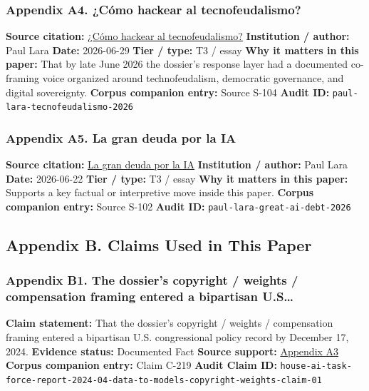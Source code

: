 \documentclass[
  american,
  11pt,
  letterpaper,
]{article}
\begin{document}
\subsubsection{Appendix A4. ¿Cómo hackear al
tecnofeudalismo?}\label{ch-00-appendix-a4-c-mo-hackear-al-tecnofeudalismo}

\textbf{Source citation:}
\href{https://www.dineroenimagen.com/paul-lara/como-hackear-al-tecnofeudalismo/186955}{¿Cómo
hackear al tecnofeudalismo?} \textbf{Institution / author:} Paul Lara
\textbf{Date:} 2026-06-29 \textbf{Tier / type:} T3 / essay \textbf{Why
it matters in this paper:} That by late June 2026 the dossier's response
layer had a documented co-framing voice organized around
technofeudalism, democratic governance, and digital sovereignty.
\textbf{Corpus companion entry:} Source S-104 \textbf{Audit ID:}
\texttt{paul-lara-tecnofeudalismo-2026}

\subsubsection{Appendix A5. La gran deuda por la
IA}\label{ch-00-appendix-a5-la-gran-deuda-por-la-ia}

\textbf{Source citation:}
\href{https://www.dineroenimagen.com/paul-lara/la-gran-deuda-por-la-ia/186930}{La
gran deuda por la IA} \textbf{Institution / author:} Paul Lara
\textbf{Date:} 2026-06-22 \textbf{Tier / type:} T3 / essay \textbf{Why
it matters in this paper:} Supports a key factual or interpretive move
inside this paper. \textbf{Corpus companion entry:} Source S-102
\textbf{Audit ID:} \texttt{paul-lara-great-ai-debt-2026}

\subsection{Appendix B. Claims Used in This
Paper}\label{appendix-b.-claims-used-in-this-paper}

\subsubsection{Appendix B1. The dossier's copyright / weights /
compensation framing entered a bipartisan
U.S\ldots{}}\label{ch-00-appendix-b1-the-dossier-s-copyright-weights-compensation-framing-entered-a-bipartisan-u-s}

\textbf{Claim statement:} That the dossier's copyright / weights /
compensation framing entered a bipartisan U.S. congressional policy
record by December 17, 2024. \textbf{Evidence status:} Documented Fact
\textbf{Source support:}
\hyperref[ch-00-appendix-a3-bipartisan-house-task-force-report-on-artificial-intelligence]{Appendix
A3} \textbf{Corpus companion entry:} Claim C-219 \textbf{Audit Claim
ID:}
\texttt{house-ai-task-force-report-2024-04-data-to-models-copyright-weights-claim-01}
\end{document}
